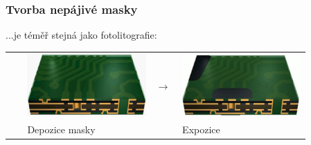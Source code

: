 \documentclass{beamer}
\begin{document}
\begin{frame}
	\frametitle{Tvorba nepájivé masky}
	...je téměř stejná jako fotolitografie:
	\begin{center}
	
		\begin{tabular}{m{0.05\linewidth} m{0.38\linewidth} m{0.05\linewidth} m{0.38\linewidth}}
		 \Large & \includegraphics[scale=0.12]{maskaFilm.png} & \Large\textbf{$\rightarrow$} & \includegraphics[scale=0.12]{maskaExpozice.png}\\
		 & Depozice masky & & Expozice \\

\end{tabular}
\end{center}
\end{frame}
\end{document}
